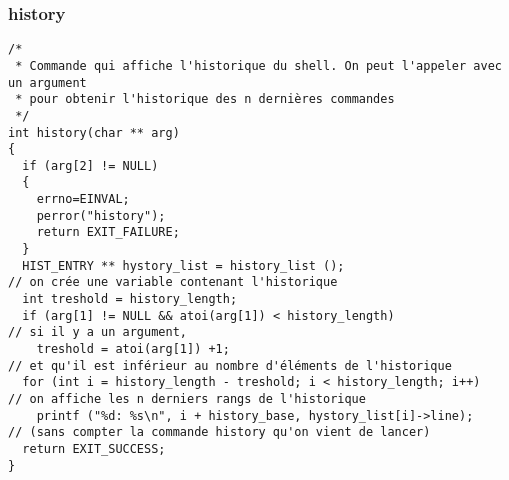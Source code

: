\documentclass[12pt]{article}
\begin{document}
\subsubsection*{history}
\label{history}
\begin{verbatim}
/*
 * Commande qui affiche l'historique du shell. On peut l'appeler avec un argument
 * pour obtenir l'historique des n dernières commandes 
 */
int history(char ** arg) 
{
  if (arg[2] != NULL)
  {
    errno=EINVAL;
    perror("history");
    return EXIT_FAILURE;
  }
  HIST_ENTRY ** hystory_list = history_list ();                       // on crée une variable contenant l'historique
  int treshold = history_length;
  if (arg[1] != NULL && atoi(arg[1]) < history_length)                // si il y a un argument, 
    treshold = atoi(arg[1]) +1;                                       // et qu'il est inférieur au nombre d'éléments de l'historique
  for (int i = history_length - treshold; i < history_length; i++)    // on affiche les n derniers rangs de l'historique
    printf ("%d: %s\n", i + history_base, hystory_list[i]->line);     // (sans compter la commande history qu'on vient de lancer)
  return EXIT_SUCCESS;
}
\end{verbatim}
\end{document}
